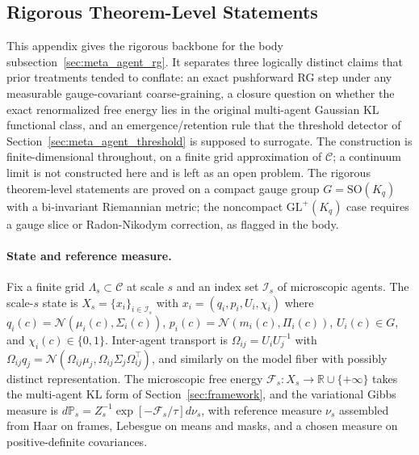 \documentclass[11pt]{article}
\begin{document}
\subsection{Rigorous Theorem-Level Statements}
\label{app:rigorous_rg}

This appendix gives the rigorous backbone for the body subsection~\ref{sec:meta_agent_rg}. It separates three logically distinct claims that prior treatments tended to conflate: an exact pushforward RG step under any measurable gauge-covariant coarse-graining, a closure question on whether the exact renormalized free energy lies in the original multi-agent Gaussian KL functional class, and an emergence/retention rule that the threshold detector of Section~\ref{sec:meta_agent_threshold} is supposed to surrogate. The construction is finite-dimensional throughout, on a finite grid approximation of $\mathcal{C}$; a continuum limit is not constructed here and is left as an open problem. The rigorous theorem-level statements are proved on a compact gauge group $G = \mathrm{SO}(K_q)$ with a bi-invariant Riemannian metric; the noncompact $\mathrm{GL}^+(K_q)$ case requires a gauge slice or Radon-Nikodym correction, as flagged in the body.

\paragraph{State and reference measure.}
Fix a finite grid $\Lambda_s \subset \mathcal{C}$ at scale $s$ and an index set $\mathcal{I}_s$ of microscopic agents. The scale-$s$ state is $X_s = \{x_i\}_{i \in \mathcal{I}_s}$ with $x_i = (q_i, p_i, U_i, \chi_i)$ where $q_i(c) = \mathcal{N}(\mu_i(c), \Sigma_i(c))$, $p_i(c) = \mathcal{N}(m_i(c), \Pi_i(c))$, $U_i(c) \in G$, and $\chi_i(c) \in \{0, 1\}$. Inter-agent transport is $\Omega_{ij} = U_i U_j^{-1}$ with $\Omega_{ij} q_j = \mathcal{N}(\Omega_{ij}\mu_j, \Omega_{ij}\Sigma_j\Omega_{ij}^\top)$, and similarly on the model fiber with possibly distinct representation. The microscopic free energy $\mathcal{F}_s : X_s \to \mathbb{R} \cup \{+\infty\}$ takes the multi-agent KL form of Section~\ref{sec:framework}, and the variational Gibbs measure is $d\mathbb{P}_s = Z_s^{-1}\exp[-\mathcal{F}_s/\tau] d\nu_s$, with reference measure $\nu_s$ assembled from Haar on frames, Lebesgue on means and masks, and a chosen measure on positive-definite covariances.
\end{document}
